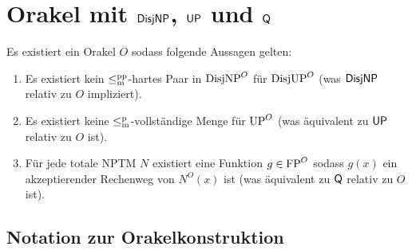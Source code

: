 \chapter{Orakel mit $\mathsf{DisjNP}$, $\mathsf{UP}$ und $\mathsf{Q}$}\label{chap:orakel}


\begin{theorem}\label{thm:myoracle}
    Es existiert ein Orakel $O$ sodass folgende Aussagen gelten:
    \begin{enumerate}
        \item Es existiert kein $\leq_\mathrm{m}^\mathrm{pp}$-hartes Paar in $\mathrm{DisjNP}^O$ für $\mathrm{DisjUP}^O$ (was $\mathsf{DisjNP}$ relativ zu $O$ impliziert).
        \item Es existiert keine $\leq_\mathrm{m}^\mathrm{p}$-vollständige Menge für $\mathrm{UP}^O$ (was äquivalent zu $\mathsf{UP}$ relativ zu $O$ ist).
        \item Für jede totale NPTM $N$ existiert eine Funktion $g\in\mathrm{FP}^O$ sodass $g(x)$ ein akzeptierender Rechenweg von $N^O(x)$ ist (was äquivalent zu $\mathsf{Q}$ relativ zu $O$ ist).
    \end{enumerate}
\end{theorem}

\section{Notation zur Orakelkonstruktion}

